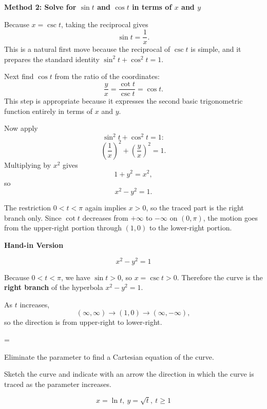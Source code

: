 \documentclass[a4paper,12pt,twocolumn]{article}
\newlength{\problemnumberwidth}
\newenvironment{solutionbox}{\begin{framed}}{\end{framed}}
\newcommand{\problem}[3]{%
  \Needspace{10\baselineskip}%
  \phantomsection\label{#1}%
  \par\vspace{0.8em}%
  \noindent
  \hangindent=\problemnumberwidth
  \hangafter=1
  \makebox[\problemnumberwidth][l]{\textbf{#2.}}#3\par
}
\begin{document}
\begin{solutionbox}
\textbf{Method 2: Solve for \(\sin t\) and \(\cos t\) in terms of \(x\) and \(y\)}

\begin{steps}
\item Because \(x=\csc t\), taking the reciprocal gives
\[
\sin t=\frac{1}{x}.
\]
This is a natural first move because the reciprocal of \(\csc t\) is simple, and it prepares the standard identity \(\sin^2 t+\cos^2 t=1\).

\item Next find \(\cos t\) from the ratio of the coordinates:
\[
\frac{y}{x}=\frac{\cot t}{\csc t}=\cos t.
\]
This step is appropriate because it expresses the second basic trigonometric function entirely in terms of \(x\) and \(y\).

\item Now apply
\[
\sin^2 t+\cos^2 t=1:
\]
\[
\left(\frac{1}{x}\right)^2+\left(\frac{y}{x}\right)^2=1.
\]
Multiplying by \(x^2\) gives
\[
1+y^2=x^2,
\]
so
\[
x^2-y^2=1.
\]

\item The restriction \(0<t<\pi\) again implies \(x>0\), so the traced part is the right branch only. Since \(\cot t\) decreases from \(+\infty\) to \(-\infty\) on \((0,\pi)\), the motion goes from the upper-right portion through \((1,0)\) to the lower-right portion.
\end{steps}
\end{solutionbox}

\begin{solutionbox}
\textbf{Hand-in Version}

\[
\boxed{x^2-y^2=1}
\]

Because \(0<t<\pi\), we have \(\sin t>0\), so \(x=\csc t>0\). Therefore the curve is the \textbf{right branch} of the hyperbola \(x^2-y^2=1\).

As \(t\) increases,
\[
(\infty,\infty)\to(1,0)\to(\infty,-\infty),
\]
so the direction is from upper-right to lower-right.
\end{solutionbox}

\problem{prob:10-1-19}{19}{%
\begin{subparts}
\item Eliminate the parameter to find a Cartesian equation of the curve.
\item Sketch the curve and indicate with an arrow the direction in which the curve is traced as the parameter increases.
\end{subparts}
\[
x=\ln t,\ y=\sqrt{t},\ t\geq 1
\]}
\end{document}

